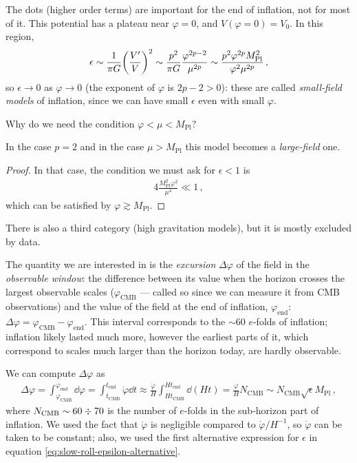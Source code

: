 \documentclass[main.tex]{subfiles}
\begin{document}
The dots (higher order terms) are important for the end of inflation, not for most of it. 
This potential has a plateau near \(\varphi = 0\), and \(V(\varphi = 0) = V_0 \).
In this region, 
%
\begin{align}
\epsilon \sim \frac{1}{\pi G} \qty(\frac{V'}{V})^2
\sim \frac{p^2}{\pi G} \frac{\varphi^{2p-2}}{\mu^{2p}} 
\sim \frac{p^2 \varphi^{2p} M _{\text{Pl}}^2}{\varphi^2 \mu^{2p}} 
\,,
\end{align}
%
so \(\epsilon \to 0\) as \(\varphi \to 0\) (the exponent of \(\varphi \) is \(2p -2 > 0\)): these are called \emph{small-field models} of inflation, since we can have small \(\epsilon \) even with small \(\varphi \).

Why do we need the condition \(\varphi < \mu < M _{\text{Pl}}\)? 

\begin{claim}
In the case \(p = 2\) and in the case \(\mu > M _{\text{Pl}}\) this model becomes a \emph{large-field} one. 
\end{claim}
\begin{proof}
In that case, the condition we must ask for \(\epsilon < 1\) is 
%
\begin{align}
4 \frac{M _{\text{Pl}}^2 \varphi^2}{\mu^{4}} \ll 1
\,,
\end{align}
%
which can be satisfied by \(\varphi \gtrsim M _{\text{Pl}}\). 
\end{proof}

There is also a third category (high gravitation models), but it is mostly excluded by data. 

The quantity we are interested in is the \emph{excursion} \(\Delta \varphi \) of the field in the \emph{observable window}: the difference between its value when the horizon crosses the largest observable scales (\(\varphi _{\text{CMB}}\) --- called so since we can measure it from CMB observations) and the value of the field at the end of inflation, \(\varphi _{\text{end}}\): \(\Delta \varphi = \varphi _{\text{CMB}} - \varphi _{\text{end}}\). 
This interval corresponds to the \(\sim 60\) \(e\)-folds of inflation; inflation likely lasted much more, however the earliest parts of it, which correspond to scales much larger than the horizon today, are hardly observable. 

We can compute \(\Delta \varphi \) as 
%
\begin{align}
\Delta \varphi  = \int_{\varphi _{\text{CMB}}}^{\varphi _{\text{end}}} \dd{\varphi } = \int_{t _{\text{CMB}}}^{t _{\text{end}}} \dot{\varphi} \dd{t} \approx \frac{\dot{\varphi}}{H} \int_{H t _{\text{CMB}}}^{H t _{\text{end}}} \dd{(Ht)} = \frac{\dot{\varphi}}{H} 
N _{\text{CMB}} \sim N _{\text{CMB}} \sqrt{\epsilon } M _{\text{Pl}}
\,,
\end{align}
%
where \(N _{\text{CMB}} \sim 60 \divisionsymbol 70\) is the number of \(e\)-folds in the sub-horizon part of inflation. 
We used the fact that \(\ddot{\varphi}\) is negligible compared to \(\dot{\varphi} / H^{-1}\), so \(\dot{\varphi}\) can be taken to be constant; also, we used the first alternative expression for \(\epsilon \) in equation \eqref{eq:slow-roll-epsilon-alternative}. 
\end{document}
